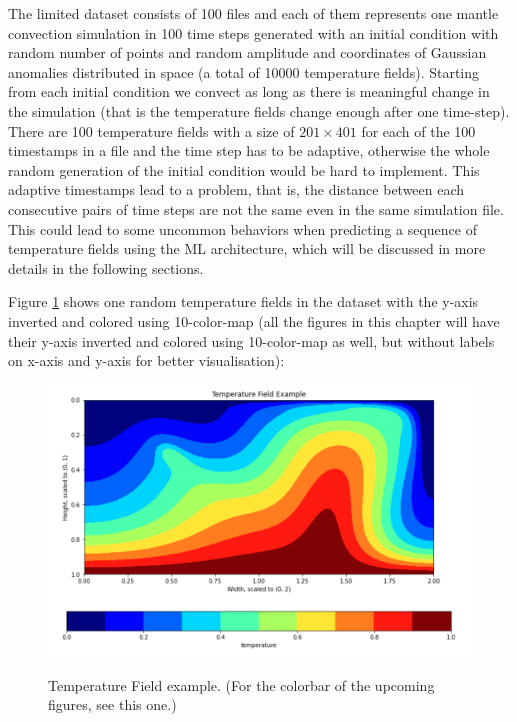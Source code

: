 The limited dataset consists of 100 files and each of them represents one mantle convection simulation in 100 time steps generated with an initial condition with random number of points and random amplitude and coordinates of Gaussian anomalies distributed in space (a total of 10000 temperature fields). Starting from each initial condition we convect as long as there is meaningful change in the simulation (that is the temperature fields change enough after one time-step). There are 100 temperature fields with a size of $201 \times 401$ for each of the 100 timestamps in a file and the time step has to be adaptive, otherwise the whole random generation of the initial condition would be hard to implement. This adaptive timestamps lead to a problem, that is, the distance between each consecutive pairs of time steps are not the same even in the same simulation file. This could lead to some uncommon behaviors when predicting a sequence of temperature fields using the ML architecture, which will be discussed in more details in the following sections.

Figure \ref{figure:temperature_field_sample} shows one random temperature fields in the dataset with the y-axis inverted and colored using 10-color-map (all the figures in this chapter will have their y-axis inverted and colored using 10-color-map as well, but without labels on x-axis and y-axis for better visualisation):

\begin{figure}[H]
    \caption{Temperature Field example. (For the colorbar of the upcoming figures, see this one.)}
    \includegraphics[scale=0.6]{figures/mantle_convection_images/temperature_field_example.png}
    \label{figure:temperature_field_sample}
\end{figure}

